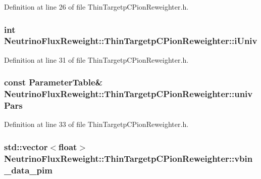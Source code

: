 Definition at line 26 of file Thin\-Targetp\-C\-Pion\-Reweighter.\-h.

\hypertarget{class_neutrino_flux_reweight_1_1_thin_targetp_c_pion_reweighter_a59ed15e151960ba8dc990d8c6bbd7567}{
\subsubsection[{i\-Univ}]{\setlength{\rightskip}{0pt plus 5cm}int Neutrino\-Flux\-Reweight\-::\-Thin\-Targetp\-C\-Pion\-Reweighter\-::i\-Univ\hspace{0.3cm}{\ttfamily [private]}}}\label{class_neutrino_flux_reweight_1_1_thin_targetp_c_pion_reweighter_a59ed15e151960ba8dc990d8c6bbd7567}


Definition at line 31 of file Thin\-Targetp\-C\-Pion\-Reweighter.\-h.

\hypertarget{class_neutrino_flux_reweight_1_1_thin_targetp_c_pion_reweighter_afc6d553d64c70f7b98636b2bb8a13b43}{
\subsubsection[{univ\-Pars}]{\setlength{\rightskip}{0pt plus 5cm}const {\bf Parameter\-Table}\& Neutrino\-Flux\-Reweight\-::\-Thin\-Targetp\-C\-Pion\-Reweighter\-::univ\-Pars\hspace{0.3cm}{\ttfamily [private]}}}\label{class_neutrino_flux_reweight_1_1_thin_targetp_c_pion_reweighter_afc6d553d64c70f7b98636b2bb8a13b43}


Definition at line 33 of file Thin\-Targetp\-C\-Pion\-Reweighter.\-h.

\hypertarget{class_neutrino_flux_reweight_1_1_thin_targetp_c_pion_reweighter_aea0dca1b93e560e26871da0bdf1ac075}{
\subsubsection[{vbin\-\_\-data\-\_\-pim}]{\setlength{\rightskip}{0pt plus 5cm}std\-::vector$<$float$>$ Neutrino\-Flux\-Reweight\-::\-Thin\-Targetp\-C\-Pion\-Reweighter\-::vbin\-\_\-data\-\_\-pim}}\label{class_neutrino_flux_reweight_1_1_thin_targetp_c_pion_reweighter_aea0dca1b93e560e26871da0bdf1ac075}



